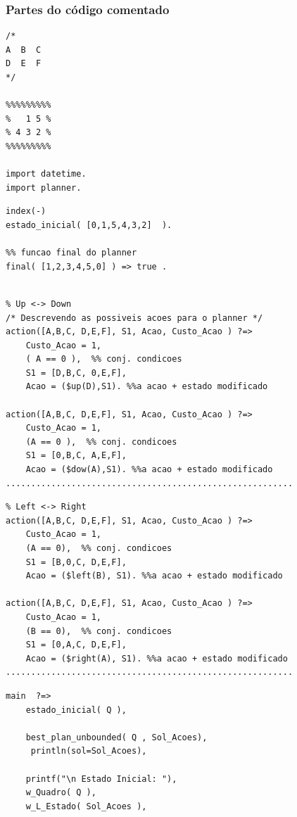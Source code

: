 \begin{frame}[fragile, allowframebreaks=0.9]
 \frametitle{Partes do  código comentado}

\begin{verbatim}
/*
A  B  C 
D  E  F
*/

%%%%%%%%%
%   1 5 %
% 4 3 2 %
%%%%%%%%%

import datetime.
import planner.
\end{verbatim}
\framebreak

\begin{verbatim}
index(-)
estado_inicial( [0,1,5,4,3,2]  ).

%% funcao final do planner
final( [1,2,3,4,5,0] ) => true .


\end{verbatim}
\framebreak

\begin{verbatim}
% Up <-> Down
/* Descrevendo as possiveis acoes para o planner */
action([A,B,C, D,E,F], S1, Acao, Custo_Acao ) ?=>
    Custo_Acao = 1,
    ( A == 0 ),  %% conj. condicoes
    S1 = [D,B,C, 0,E,F], 
    Acao = ($up(D),S1). %%a acao + estado modificado

action([A,B,C, D,E,F], S1, Acao, Custo_Acao ) ?=>
    Custo_Acao = 1,
    (A == 0 ),  %% conj. condicoes
    S1 = [0,B,C, A,E,F],
    Acao = ($dow(A),S1). %%a acao + estado modificado
.........................................................
\end{verbatim}
\framebreak


\begin{verbatim}
% Left <-> Right
action([A,B,C, D,E,F], S1, Acao, Custo_Acao ) ?=>
    Custo_Acao = 1,
    (A == 0),  %% conj. condicoes
    S1 = [B,0,C, D,E,F],
    Acao = ($left(B), S1). %%a acao + estado modificado
    
action([A,B,C, D,E,F], S1, Acao, Custo_Acao ) ?=>
    Custo_Acao = 1,
    (B == 0),  %% conj. condicoes
    S1 = [0,A,C, D,E,F],
    Acao = ($right(A), S1). %%a acao + estado modificado
.........................................................
\end{verbatim}

\framebreak

\begin{small}
\begin{verbatim}
main  ?=>  
    estado_inicial( Q ),
   
    best_plan_unbounded( Q , Sol_Acoes), 
     println(sol=Sol_Acoes),
        
    printf("\n Estado Inicial: "),
    w_Quadro( Q ), 
    w_L_Estado( Sol_Acoes ), 
  

\end{verbatim}
\end{small}
\end{frame}
